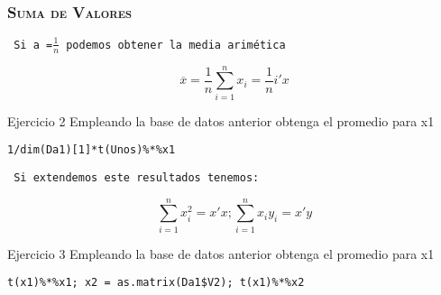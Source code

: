 \documentclass[16.5pt]{beamer}
\begin{document}


{
\begin{frame}
\frametitle{\textsc{\textbf{Suma de Valores}}}
\hspace*{-5mm}
\vspace*{-2mm} 
\vspace{0.3cm}

\texttt{{\color{blue} Si a =$\frac{1}{n}$ podemos obtener la media arimética}}
\begin{tiny}
\[ \overline{x} = \frac{1}{n}\sum_{i=1}^n  x_i =\frac{1}{n}i'x \]
\end{tiny}

\begin{bclogo}{Ejercicio 2}
 {\tiny\color{blue} Empleando la base de datos anterior obtenga el promedio para x1}
\begin{lstlisting}[basicstyle=\tiny]
1/dim(Da1)[1]*t(Unos)%*%x1
\end{lstlisting}
\end{bclogo}


\texttt{  {\color{blue} Si extendemos este resultados tenemos:}}

\begin{tiny}
\[ \sum_{i=1}^n  x_i^2 = x'x; \sum_{i=1}^n  x_iy_i = x'y \]
\end{tiny}


\begin{bclogo}{Ejercicio 3}
 {\tiny\color{blue} Empleando la base de datos anterior obtenga el promedio para x1}
\begin{lstlisting}[basicstyle=\tiny]
t(x1)%*%x1; x2 = as.matrix(Da1$V2); t(x1)%*%x2
\end{lstlisting}
\end{bclogo}

\end{frame}
}

\end{document}
